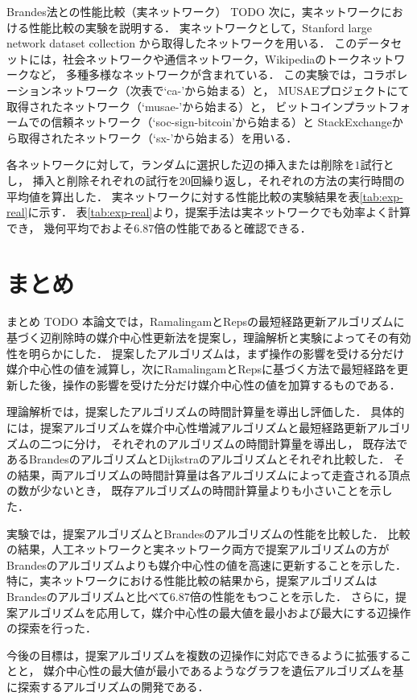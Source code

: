 \documentclass[dvipdfmx,fleqn]{beamer}
\begin{document}
\begin{frame}[allowframebreaks]{Brandes法との性能比較（実ネットワーク）}
  \alert{TODO}
  次に，実ネットワークにおける性能比較の実験を説明する．
  実ネットワークとして，Stanford large network dataset collection\cite{32Leskovec2016}
  から取得したネットワークを用いる．
  このデータセットには，社会ネットワークや通信ネットワーク，Wikipediaのトークネットワークなど，
  多種多様なネットワークが含まれている．
  この実験では，コラボレーションネットワーク（次表で`ca-'から始まる）と，
  MUSAEプロジェクト\cite{33Rozemberczki2019b}にて取得されたネットワーク（`musae-'から始まる）と，
  ビットコインプラットフォームでの信頼ネットワーク（`soc-sign-bitcoin'から始まる）と
  StackExchangeから取得されたネットワーク（`sx-'から始まる）を用いる．
  
  各ネットワークに対して，ランダムに選択した辺の挿入または削除を$1$試行とし，
  挿入と削除それぞれの試行を$20$回繰り返し，それぞれの方法の実行時間の平均値を算出した．
  実ネットワークに対する性能比較の実験結果を表\ref{tab:exp-real}に示す．
  表\ref{tab:exp-real}より，提案手法は実ネットワークでも効率よく計算でき，
  幾何平均でおよそ$6.87$倍の性能であると確認できる．

  
\end{frame}

\section{まとめ}
\begin{frame}[allowframebreaks]{まとめ}
  \alert{TODO}
  本論文では，RamalingamとRepsの最短経路更新アルゴリズムに基づく辺削除時の媒介中心性更新法を提案し，理論解析と実験によってその有効性を明らかにした．
  提案したアルゴリズムは，まず操作の影響を受ける分だけ媒介中心性の値を減算し，次にRamalingamとRepsに基づく方法で最短経路を更新した後，操作の影響を受けた分だけ媒介中心性の値を加算するものである．
  
  理論解析では，提案したアルゴリズムの時間計算量を導出し評価した．
  具体的には，提案アルゴリズムを媒介中心性増減アルゴリズムと最短経路更新アルゴリズムの二つに分け，
  それぞれのアルゴリズムの時間計算量を導出し，
  既存法であるBrandesのアルゴリズムとDijkstraのアルゴリズムとそれぞれ比較した．
  その結果，両アルゴリズムの時間計算量は各アルゴリズムによって走査される頂点の数が少ないとき，
  既存アルゴリズムの時間計算量よりも小さいことを示した．
  
  実験では，提案アルゴリズムとBrandesのアルゴリズムの性能を比較した．
  比較の結果，人工ネットワークと実ネットワーク両方で提案アルゴリズムの方がBrandesのアルゴリズムよりも媒介中心性の値を高速に更新することを示した．
  特に，実ネットワークにおける性能比較の結果から，提案アルゴリズムはBrandesのアルゴリズムと比べて$6.87$倍の性能をもつことを示した．
  さらに，提案アルゴリズムを応用して，媒介中心性の最大値を最小および最大にする辺操作の探索を行った．
  
  今後の目標は，提案アルゴリズムを複数の辺操作に対応できるように拡張することと，
  媒介中心性の最大値が最小であるようなグラフを遺伝アルゴリズムを基に探索するアルゴリズムの開発である．
\end{frame}
\end{document}
